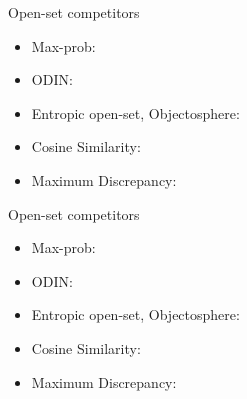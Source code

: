 \documentclass[aspectratio=169]{beamer}
\newcommand{\backupend}{
   \setcounter{framenumber}{\value{finalframe}}
}
\begin{document}
\begin{frame}{Open-set competitors}
\begin{itemize}
\item Max-prob: \\ 
\item ODIN: \\ 
\item Entropic open-set, Objectosphere: \\ 
\item Cosine Similarity: \\ 
\item Maximum Discrepancy: \\ 
\end{itemize}
\end{frame}
\begin{frame}{Open-set competitors}
\begin{itemize}
\item Max-prob: \\ 
\item ODIN: \\ 
\item Entropic open-set, Objectosphere: \\ 
\item Cosine Similarity: \\ 
\item Maximum Discrepancy: \\ 
\end{itemize}
\end{frame}


\backupend
\end{document}
